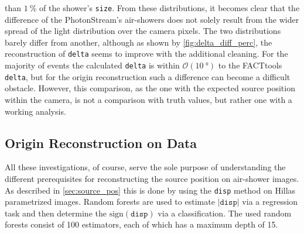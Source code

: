 than $\SI{1}{\percent}$ of the shower's \texttt{size}.
From these distributions, it becomes clear that the difference of the
PhotonStream's air-showers does not solely result from the wider spread of
the light distribution over the camera pixels. The two distributions barely
differ from another, although as shown by \autoref{fig:delta_diff_perc}, the
reconstruction of \texttt{delta} seems to improve with the additional
cleaning. For the majority of events the calculated \texttt{delta} is within
$\mathcal{O}(\SI{10}{\degree})$ to the FACTtools \texttt{delta}, but for the
origin reconstruction such a difference can become a difficult obstacle.
However, this comparison, as the one with the expected source position
within the camera, is not a comparison with truth values, but rather one
with a working analysis.

\subsection{Origin Reconstruction on Data}

All these investigations, of course, serve the sole purpose of understanding
the different prerequisites for reconstructing the source position on
air-shower images. As described in \autoref{sec:source_pos} this is done by
using the \texttt{disp} method on Hillas parametrized images. Random forests
are used to estimate $|\texttt{disp}|$ via a regression task and then determine
the $\text{sign}(\texttt{disp})$ via a classification. The used random forests
consist of \num{100} estimators, each of which has a maximum depth of \num{15}.

